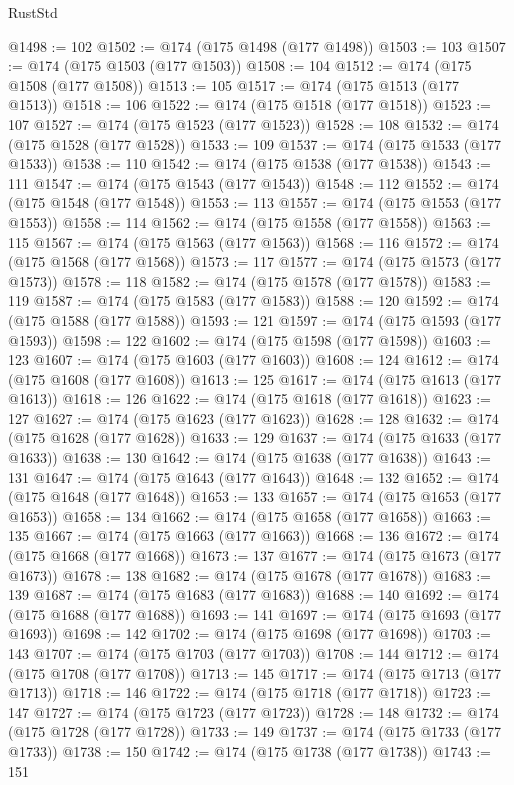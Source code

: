 \begin{lexlean}{RustStd}
\begin{coremodule}
@1498 := 102
@1502 := @174 (@175 @1498 (@177 @1498))
@1503 := 103
@1507 := @174 (@175 @1503 (@177 @1503))
@1508 := 104
@1512 := @174 (@175 @1508 (@177 @1508))
@1513 := 105
@1517 := @174 (@175 @1513 (@177 @1513))
@1518 := 106
@1522 := @174 (@175 @1518 (@177 @1518))
@1523 := 107
@1527 := @174 (@175 @1523 (@177 @1523))
@1528 := 108
@1532 := @174 (@175 @1528 (@177 @1528))
@1533 := 109
@1537 := @174 (@175 @1533 (@177 @1533))
@1538 := 110
@1542 := @174 (@175 @1538 (@177 @1538))
@1543 := 111
@1547 := @174 (@175 @1543 (@177 @1543))
@1548 := 112
@1552 := @174 (@175 @1548 (@177 @1548))
@1553 := 113
@1557 := @174 (@175 @1553 (@177 @1553))
@1558 := 114
@1562 := @174 (@175 @1558 (@177 @1558))
@1563 := 115
@1567 := @174 (@175 @1563 (@177 @1563))
@1568 := 116
@1572 := @174 (@175 @1568 (@177 @1568))
@1573 := 117
@1577 := @174 (@175 @1573 (@177 @1573))
@1578 := 118
@1582 := @174 (@175 @1578 (@177 @1578))
@1583 := 119
@1587 := @174 (@175 @1583 (@177 @1583))
@1588 := 120
@1592 := @174 (@175 @1588 (@177 @1588))
@1593 := 121
@1597 := @174 (@175 @1593 (@177 @1593))
@1598 := 122
@1602 := @174 (@175 @1598 (@177 @1598))
@1603 := 123
@1607 := @174 (@175 @1603 (@177 @1603))
@1608 := 124
@1612 := @174 (@175 @1608 (@177 @1608))
@1613 := 125
@1617 := @174 (@175 @1613 (@177 @1613))
@1618 := 126
@1622 := @174 (@175 @1618 (@177 @1618))
@1623 := 127
@1627 := @174 (@175 @1623 (@177 @1623))
@1628 := 128
@1632 := @174 (@175 @1628 (@177 @1628))
@1633 := 129
@1637 := @174 (@175 @1633 (@177 @1633))
@1638 := 130
@1642 := @174 (@175 @1638 (@177 @1638))
@1643 := 131
@1647 := @174 (@175 @1643 (@177 @1643))
@1648 := 132
@1652 := @174 (@175 @1648 (@177 @1648))
@1653 := 133
@1657 := @174 (@175 @1653 (@177 @1653))
@1658 := 134
@1662 := @174 (@175 @1658 (@177 @1658))
@1663 := 135
@1667 := @174 (@175 @1663 (@177 @1663))
@1668 := 136
@1672 := @174 (@175 @1668 (@177 @1668))
@1673 := 137
@1677 := @174 (@175 @1673 (@177 @1673))
@1678 := 138
@1682 := @174 (@175 @1678 (@177 @1678))
@1683 := 139
@1687 := @174 (@175 @1683 (@177 @1683))
@1688 := 140
@1692 := @174 (@175 @1688 (@177 @1688))
@1693 := 141
@1697 := @174 (@175 @1693 (@177 @1693))
@1698 := 142
@1702 := @174 (@175 @1698 (@177 @1698))
@1703 := 143
@1707 := @174 (@175 @1703 (@177 @1703))
@1708 := 144
@1712 := @174 (@175 @1708 (@177 @1708))
@1713 := 145
@1717 := @174 (@175 @1713 (@177 @1713))
@1718 := 146
@1722 := @174 (@175 @1718 (@177 @1718))
@1723 := 147
@1727 := @174 (@175 @1723 (@177 @1723))
@1728 := 148
@1732 := @174 (@175 @1728 (@177 @1728))
@1733 := 149
@1737 := @174 (@175 @1733 (@177 @1733))
@1738 := 150
@1742 := @174 (@175 @1738 (@177 @1738))
@1743 := 151

\end{coremodule}
\end{lexlean}
